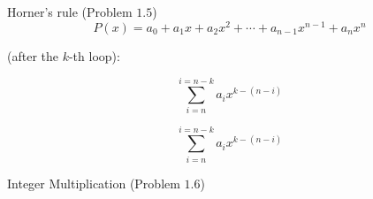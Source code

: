 
\begin{frame}{}
  \centerline{\Large {}}

\end{frame}

\begin{frame}{}
  \begin{exampleblock}{Horner's rule (Problem $1.5$)}
    \[
      P(x) = a_0 + a_1 x + a_2 x^2 + \cdots + a_{n-1} x^{n-1} + a_n x^n
    \]

    
  \end{exampleblock}

  \pause
  \vspace{0.50cm}
  \centerline{ (after the $k$-th loop):}
  \[
    \sum_{i = n}^{i = n-k} a_i x^{k-(n-i)}
  \]
\end{frame}

\begin{frame}{}
  \[
    \sum_{i = n}^{i = n-k} a_i x^{k-(n-i)}
  \]
\end{frame}

\begin{frame}{}
  \begin{exampleblock}{Integer Multiplication (Problem $1.6$)}
    
  \end{exampleblock}
  
  \pause
\end{frame}

